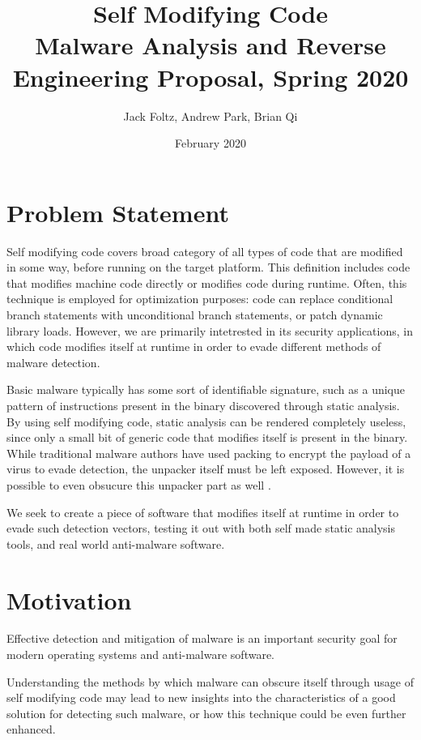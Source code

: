 \documentclass{article}
\title{Self Modifying Code \\ \small Malware Analysis and Reverse Engineering Proposal, Spring 2020}
\author{Jack Foltz, Andrew Park, Brian Qi}
\date{February 2020}
\begin{document}
\maketitle


\section{Problem Statement}
Self modifying code covers broad category of all types of code that
are modified in some way, before running on the target platform. This
definition includes code that modifies machine code directly or
modifies code during runtime. Often, this technique is employed for
optimization purposes: code can replace conditional branch statements
with unconditional branch statements, or patch dynamic library loads.
However, we are primarily intetrested in its security applications, in
which code modifies itself at runtime in order to evade different
methods of malware detection.

Basic malware typically has some sort of identifiable signature, such
as a unique pattern of instructions present in the binary discovered
through static analysis. By using self modifying code, static analysis
can be rendered completely useless, since only a small bit of generic
code that modifies itself is present in the binary. While traditional
malware authors have used packing to encrypt the payload of a virus to
evade detection, the unpacker itself must be left exposed. However, it
is possible to even obsucure this unpacker part as well
\cite{cai2007certified}.

We seek to create a piece of software that modifies itself at runtime
in order to evade such detection vectors, testing it out with both
self made static analysis tools, and real world anti-malware software.


\section{Motivation}
Effective detection and mitigation of malware is an important security
goal for modern operating systems and anti-malware software.

Understanding the methods by which malware can obscure itself through
usage of self modifying code may lead to new insights into the
characteristics of a good solution for detecting such malware, or how
this technique could be even further enhanced.





\end{document}
